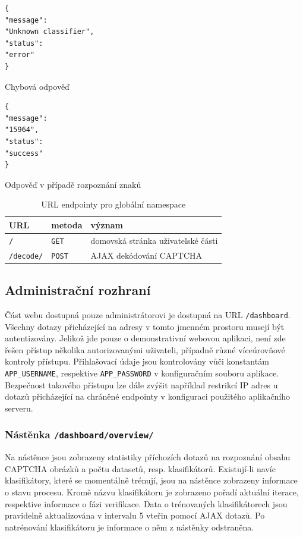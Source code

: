 \documentclass[
  field=ainfp,
  master=true,
  biblatex,
  sourcecodes=false,
  theorems=false,
  glossaries,
  index
]{kidiplom}
\begin{document}
\begin{minipage}[t]{0.45\textwidth}
\begin{verbatim}
{
"message":
"Unknown classifier",
"status":
"error"
}
\end{verbatim}
Chybová odpověď
\end{minipage}
\begin{minipage}[t]{0.45\textwidth}
\begin{verbatim}
{
"message":
"15964",
"status":
"success"
}
\end{verbatim}
Odpověď v případě rozpoznání znaků
\end{minipage}

\begin{table}[H]
\centering
\begin{tabular}{|l|l|l|}
\hline
\textbf{URL} & \textbf{metoda} & \textbf{význam}
\\ \hline
\texttt{/} & \texttt{GET} & domovská stránka uživatelské části
\\ \hline
\texttt{/decode/} & \texttt{POST} & AJAX dekódování CAPTCHA
\\ \hline
\end{tabular}
\caption{URL endpointy pro globální namespace}
\end{table}

\subsection{Administrační rozhraní}
Část webu dostupná pouze administrátorovi je dostupná na URL \texttt{/dashboard}. Všechny dotazy přicházející na adresy v tomto jmenném prostoru musejí být autentizovány. Jelikož jde pouze o demonstrativní webovou aplikaci, není zde řešen přístup několika autorizovanými uživateli, případně různé víceúrovňové kontroly přístupu. Přihlašovací údaje jsou kontrolovány vůči konstantám \texttt{APP\_USERNAME}, respektive \texttt{APP\_PASSWORD} v konfiguračním souboru aplikace. Bezpečnost ta\-ko\-vého přístupu lze dále zvýšit například restrikcí IP adres u dotazů přicházející na chráněné endpointy v konfiguraci použitého aplikačního serveru.

\subsubsection*{Nástěnka \texttt{/dashboard/overview/}}
 Na nástěnce jsou zobrazeny statistiky příchozích dotazů na rozpoznání obsahu CAPTCHA obrázků a počtu datasetů, resp. klasifikátorů. Existují-li navíc klasifikátory, které se momentálně trénují, jsou na nástěnce zobrazeny informace o stavu procesu. Kromě názvu klasifikátoru je zobrazeno pořadí aktuální iterace, respektive informace o fázi verifikace. Data o trénovaných klasifikátorech jsou pravidelně aktualizována v intervalu 5 vteřin pomocí AJAX dotazů. Po natrénování klasifikátoru je informace o něm z nástěnky odstraněna.
\end{document}
